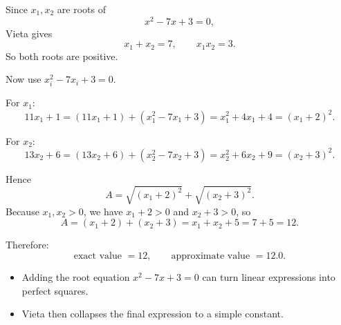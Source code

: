\begin{solution}
Since $x_1,x_2$ are roots of
\[
x^2-7x+3=0,
\]
Vieta gives
\[
x_1+x_2=7,\qquad x_1x_2=3.
\]
So both roots are positive.

Now use $x_i^2-7x_i+3=0$.

For $x_1$:
\[
11x_1+1=(11x_1+1)+(x_1^2-7x_1+3)=x_1^2+4x_1+4=(x_1+2)^2.
\]

For $x_2$:
\[
13x_2+6=(13x_2+6)+(x_2^2-7x_2+3)=x_2^2+6x_2+9=(x_2+3)^2.
\]

Hence
\[
A=\sqrt{(x_1+2)^2}+\sqrt{(x_2+3)^2}.
\]
Because $x_1,x_2>0$, we have $x_1+2>0$ and $x_2+3>0$, so
\[
A=(x_1+2)+(x_2+3)=x_1+x_2+5=7+5=\boxed{12}.
\]

Therefore:
\[
\text{exact value }=12,\qquad \text{approximate value }=12.0.
\]
\end{solution}

\begin{takeaways}
\begin{itemize}[leftmargin=*]
\item Adding the root equation $x^2-7x+3=0$ can turn linear expressions into perfect squares.
\item Vieta then collapses the final expression to a simple constant.
\end{itemize}
\end{takeaways}
